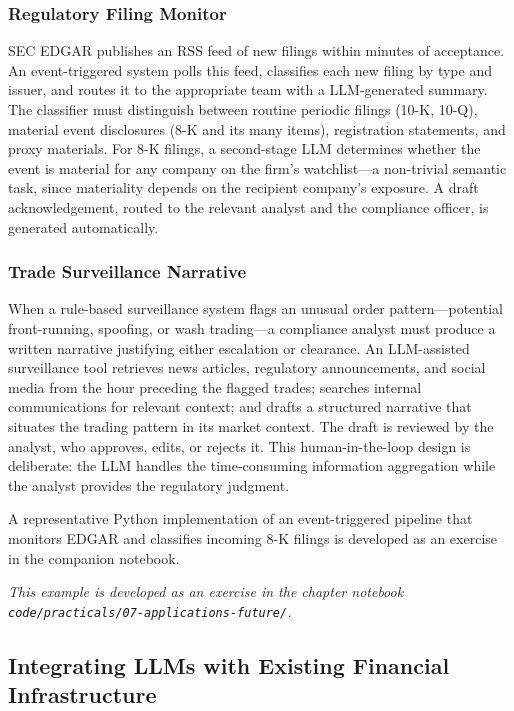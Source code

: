 \begin{context}
\subsubsection*{Regulatory Filing Monitor}
SEC EDGAR publishes an RSS feed of new filings within minutes of acceptance. An event-triggered system polls this feed, classifies each new filing by type and issuer, and routes it to the appropriate team with a LLM-generated summary. The classifier must distinguish between routine periodic filings (10-K, 10-Q), material event disclosures (8-K and its many items), registration statements, and proxy materials. For 8-K filings, a second-stage LLM determines whether the event is material for any company on the firm's watchlist---a non-trivial semantic task, since materiality depends on the recipient company's exposure. A draft acknowledgement, routed to the relevant analyst and the compliance officer, is generated automatically.

\subsubsection*{Trade Surveillance Narrative}
When a rule-based surveillance system flags an unusual order pattern---potential front-running, spoofing, or wash trading---a compliance analyst must produce a written narrative justifying either escalation or clearance. An LLM-assisted surveillance tool retrieves news articles, regulatory announcements, and social media from the hour preceding the flagged trades; searches internal communications for relevant context; and drafts a structured narrative that situates the trading pattern in its market context. The draft is reviewed by the analyst, who approves, edits, or rejects it. This human-in-the-loop design is deliberate: the LLM handles the time-consuming information aggregation while the analyst provides the regulatory judgment.

A representative Python implementation of an event-triggered pipeline that monitors EDGAR and classifies incoming 8-K filings is developed as an exercise in the companion notebook.

\textit{This example is developed as an exercise in the chapter notebook \texttt{code/practicals/07-applications-future/}.}

\subsection{Integrating LLMs with Existing Financial Infrastructure}
\label{subsec:af-workflows-integration}


\end{context}
